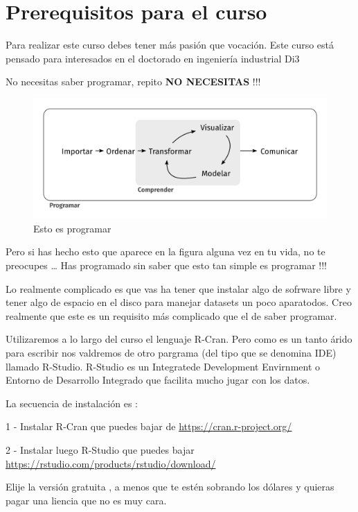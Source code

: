 \documentclass[]{article}
\begin{document}
\section{Prerequisitos para el curso}\label{prerequisitos-para-el-curso}

Para realizar este curso debes tener más pasión que vocación. Este curso
está pensado para interesados en el doctorado en ingeniería industrial
Di3

No necesitas saber programar, repito \textbf{NO NECESITAS} !!!

\begin{figure}
\centering
\includegraphics{data-science.png}
\caption{Esto es programar}
\end{figure}

Pero si has hecho esto que aparece en la figura alguna vez en tu vida,
no te preocupes \ldots{} Has programado sin saber que esto tan simple es
programar !!!

Lo realmente complicado es que vas ha tener que instalar algo de
sofrware libre y tener algo de espacio en el disco para manejar datasets
un poco aparatodos. Creo realmente que este es un requisito más
complicado que el de saber programar.

Utilizaremos a lo largo del curso el lenguaje R-Cran. Pero como es un
tanto árido para escribir nos valdremos de otro pargrama (del tipo que
se denomina IDE) llamado R-Studio. R-Studio es un Integratede
Development Envirnment o Entorno de Desarrollo Integrado que facilita
mucho jugar con los datos.

La secuencia de instalación es :

1 - Instalar R-Cran que puedes bajar de
\url{https://cran.r-project.org/}

2 - Instalar luego R-Studio que puedes bajar
\url{https://rstudio.com/products/rstudio/download/}

Elije la versión gratuita , a menos que te estén sobrando los dólares y
quieras pagar una liencia que no es muy cara.
\end{document}
